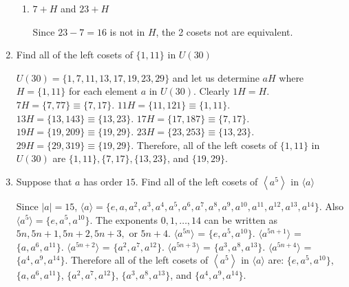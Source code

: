 \documentclass{article}
\begin{document}
\begin{enumerate}
\begin{enumerate}
        \item $7 + H$ and $23 + H$
        \begin{flushleft}
         Since $23 - 7 = 16$ is not in $H$, the 2 cosets not are equivalent.
        \end{flushleft}
    \end{enumerate}
    \item Find all of the left cosets of $\{ 1,11 \}$ in $U(30)$
    \begin{flushleft}
    $U(30) = \{ 1, 7, 11, 13, 17, 19, 23, 29 \}$ and let us determine $aH$ where $H = \{ 1, 11\}$ for each element $a$ in $U(30)$. Clearly $1H = H$. $7H = \{ 7, 77 \} \equiv \{ 7, 17\}$. $11H = \{ 11, 121 \} \equiv \{ 1, 11\}$. $13H = \{ 13, 143 \} \equiv \{ 13, 23\}$. $17H = \{ 17, 187 \} \equiv \{ 7, 17\}$. $19H = \{ 19, 209 \} \equiv \{ 19, 29\}$. $23H = \{ 23, 253 \} \equiv \{ 13, 23\}$. $29H = \{ 29, 319 \} \equiv \{ 19, 29\}$. Therefore, all of the left cosets of $\{ 1,11 \}$ in $U(30)$ are $\{ 1, 11\}, \{ 7, 17\}, \{ 13, 23\}$, and $\{ 19, 29\}$.    
    \end{flushleft}
    \item Suppose that $a$ has order $15$. Find all of the left cosets of $\left\langle a^5 \right\rangle$ in $\langle a \rangle$
    \begin{flushleft}
    Since $|a| = 15$, $\langle a\rangle = \{ e, a, a^2, a^3, a^4, a^5, a^6, a^7, a^8, a^9, a^{10}, a^{11}, a^{12}, a^{13}, a^{14} \}$. Also $\langle a^5 \rangle = \{ e, a^5, a^{10} \}$. The exponents ${0, 1, \ldots, 14}$ can be written as $5n, 5n+1, 5n+2, 5n+3,$ or $5n+4$. $\langle a^{5n} \rangle$ = $\{ e, a^5, a^{10}\}$. $\langle a^{5n+1} \rangle$ = $\{ a, a^6, a^{11}\}$. $\langle a^{5n+2} \rangle$ = $\{ a^2, a^7, a^{12}\}$. $\langle a^{5n+3} \rangle$ = $\{ a^3, a^8, a^{13}\}$. $\langle a^{5n+4} \rangle$ = $\{ a^4, a^9, a^{14}\}$. Therefore all of the left cosets of $\left\langle a^5 \right\rangle$ in $\langle a \rangle$ are: $\{ e, a^5, a^{10}\}$, $\{ a, a^6, a^{11}\}$, $\{ a^2, a^7, a^{12}\}$, $\{ a^3, a^8, a^{13}\}$, and $\{ a^4, a^9, a^{14}\}$.
    \end{flushleft}
\end{enumerate}
\end{document}
